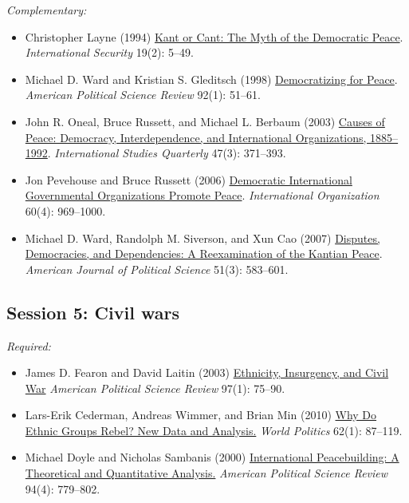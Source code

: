 \documentclass[12pt, a4paper]{article}
\begin{document}
\noindent\textit{Complementary:}

\begin{itemize}
	\item Christopher Layne (1994) \href{https://doi.org/10.2307/2539195}{Kant or Cant: The Myth of the Democratic Peace}. \textit{International Security} 19(2): 5--49.
  \item Michael D. Ward and Kristian S. Gleditsch (1998) \href{https://doi.org/10.2307/2585928}{Democratizing for Peace}. \textit{American Political Science Review} 92(1): 51--61.
	\item John R. Oneal, Bruce Russett, and Michael L. Berbaum (2003) \href{https://doi.org/10.1111/1468-2478.4703004}{Causes of Peace: Democracy, Interdependence, and International Organizations, 1885–1992}. \textit{International Studies Quarterly} 47(3): 371--393.
	\item Jon Pevehouse and Bruce Russett (2006) \href{https://doi.org/10.1017/S0020818306060322}{Democratic International Governmental Organizations Promote Peace}. \textit{International Organization} 60(4): 969--1000.
  \item Michael D. Ward, Randolph M. Siverson, and Xun Cao (2007) \href{https://doi.org/10.1111/j.1540-5907.2007.00269.x}{Disputes, Democracies, and Dependencies: A Reexamination of the Kantian Peace}. \textit{American Journal of Political Science} 51(3): 583--601.
\end{itemize}


\vspace{20pt}
\hline
\subsection*{Session 5: Civil wars}

\noindent\textit{Required:}

\begin{itemize}
  \item James D. Fearon and David Laitin (2003) \href{https://doi.org/10.1017/S0003055403000534}{Ethnicity, Insurgency, and Civil War} \textit{American Political Science Review} 97(1): 75--90.
  \item Lars-Erik Cederman, Andreas Wimmer, and Brian Min (2010) \href{https://doi.org/10.1017/S0043887109990219}{Why Do Ethnic Groups Rebel? New Data and Analysis.} \textit{World Politics} 62(1): 87--119.
  \item Michael Doyle and Nicholas Sambanis (2000) \href{https://doi.org/10.2307/2586208}{International Peacebuilding: A Theoretical and Quantitative Analysis.} \textit{American Political Science Review} 94(4): 779--802.
\end{itemize}
\end{document}
